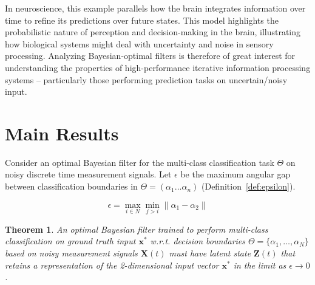 \documentclass[12pt]{article}
\newtheorem{theorem}{Theorem}
\begin{document}
In neuroscience, this example parallels how the brain integrates information over time to refine its predictions over future states. 
This model highlights the probabilistic nature of perception and decision-making in the brain, illustrating how biological systems might deal with uncertainty and noise in sensory processing.
Analyzing Bayesian-optimal filters is therefore of great interest for understanding the properties of high-performance iterative information processing systems -- particularly those performing prediction tasks on uncertain/noisy input.


\section{Main Results}
\label{sec:main}

Consider an optimal Bayesian filter for the multi-class classification task
$\Theta$ on noisy discrete time measurement signals. 
Let $\epsilon$ be the maximum angular gap between classification boundaries in $\Theta=(\alpha_1 \dots \alpha_n)$ (Definition~\ref{def:epsilon}).

\begin{equation}
	\label{def:epsilon}
	\epsilon = \max_{i \in N} \min_{j > i} \| \alpha_1 - \alpha_2 \|
\end{equation}

\begin{theorem}
	\label{thm:main}
	An optimal Bayesian filter trained to perform multi-class classification on
	ground truth input $\mathbf x^*$ w.r.t. decision boundaries 
	$\Theta = \{\alpha_1, \dots, \alpha_N\}$ based on noisy measurement signals
	$\mathbf X(t)$ must have latent state $\mathbf Z(t)$ that retains a
	representation of the 2-dimensional input vector $\mathbf x^*$ in the limit 
	as $\epsilon \to 0$. 
\end{theorem}
\end{document}
